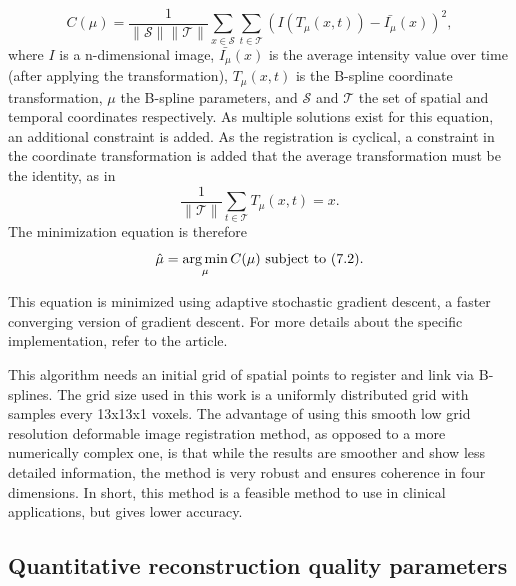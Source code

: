 \begin{equation}
C(\mu)=\frac{1}{\lVert \mathcal{S} \rVert\lVert \mathcal{T}\rVert}\sum_{x\in \mathcal{S}} \sum_{t\in\mathcal{T}}\left(I(T_\mu(x,t)) - \bar{I_\mu}(x)\right)^2,
\end{equation}
where $I$ is a n-dimensional image, $\bar{I_\mu}(x)$ is the average intensity value over time (after applying the transformation), $T_\mu(x,t)$ is the B-spline coordinate transformation, $\mu$ the B-spline parameters, and $\mathcal{S}$ and $\mathcal{T}$ the set of spatial and temporal coordinates respectively. As multiple solutions exist for this equation, an additional constraint is added. As the registration is cyclical, a constraint in the coordinate transformation is added that the average transformation must be the identity, as in
\begin{equation}
\frac{1}{\lVert \mathcal{T}\rVert}\sum_{t\in\mathcal{T}}T_\mu(x,t)=x.
\end{equation}
The minimization equation  is therefore
\begin{equation}
\hat{\mu}=\mathop{\mathrm{arg\,min}}_\mu C(\mu) \text{  subject to  } (7.2).
\end{equation}

This equation is minimized using adaptive stochastic gradient descent, a faster converging version of gradient descent\cite{klein2009adaptive}. For more details about the specific implementation, refer to the article\cite{metz2011nonrigid}.

This algorithm needs an initial grid of spatial points to register and link via B-splines. The grid size used in this work is a uniformly distributed grid with samples every 13x13x1 voxels. The advantage of using this smooth low grid resolution deformable image registration method, as opposed to a more numerically complex one, is that while the results are smoother and show less detailed information, the method is very robust and ensures coherence in four dimensions. In short, this method is a feasible method to use in clinical applications, but gives lower accuracy.
\subsection{Quantitative reconstruction quality parameters}

